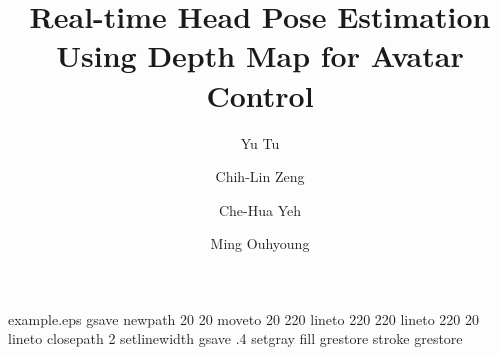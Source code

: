 %
%
%
%
%
\begin{filecontents*}{example.eps}
gsave
newpath
  20 20 moveto
  20 220 lineto
  220 220 lineto
  220 20 lineto
closepath
2 setlinewidth
gsave
  .4 setgray fill
grestore
stroke
grestore
\end{filecontents*}
%
\RequirePackage{fix-cm}
%
\documentclass[twocolumn]{svjour3}          %
%
\smartqed  %
%
\usepackage{graphicx}
\usepackage{amsmath}
%
%
%
%
%


\title{Real-time Head Pose Estimation Using Depth Map for Avatar Control%
}


\author{Yu Tu         \and
        Chih-Lin Zeng \and
        Che-Hua Yeh   \and
        Ming Ouhyoung
}



